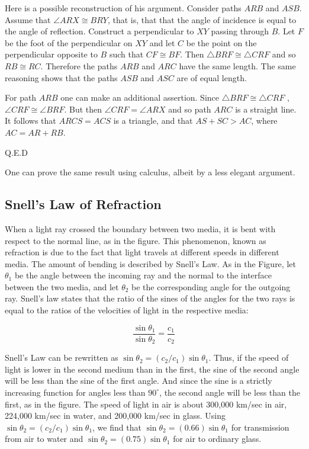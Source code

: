 Here is a possible reconstruction of his argument.  Consider
paths $ARB$ and $ASB$.  Assume that
$\angle ARX \cong BRY$, that is, that that the angle
of incidence is equal to the angle of reflection.  Construct a perpendicular to $XY$ passing through $B$. Let
$F$ be the foot of the perpendicular on $XY$ and let $C$ be the point on the perpendicular opposite to $B$ such that
$CF \cong BF$. Then $\triangle BRF \cong \triangle CRF$ and so $RB \cong RC$.  Therefore the paths $ARB$ and $ARC$ have the same length.  The same reasoning shows that the paths $ASB$  and $ASC$ are of equal length.

For path $ARB$ one can make an additional assertion.
Since $\triangle BRF \cong \triangle CRF$ , $\angle CRF \cong \angle BRF$.
But then $\angle CRF = \angle ARX$ and so path $ARC$ is a
straight line.  It follows that $ARCS = ACS$ is a triangle, and that $AS + SC > AC$, where $AC = AR + RB$.

Q.E.D

One can prove the same result using calculus, albeit by a less elegant argument.


\subsection{Snell's Law of Refraction}

When a light ray crossed the boundary between two media, it is bent with respect to the normal line, as in the figure. This phenomenon, known as refraction is due to the fact that light travels at different speeds in different media.  The amount of bending is described by Snell's Law.  As in the Figure, let $\theta_1$ be the angle between the incoming ray and the normal to the interface between the two media, and let $\theta_2$ be the corresponding angle for the outgoing ray.  Snell's law states that the ratio of the sines of the angles for the two rays is equal to the ratios of the velocities of light in the respective media:


\begin{equation}
\frac{\sin \theta_1}{\sin \theta_2} = \frac{c_1}{c_2}
\end{equation}

 Snell's Law can be rewritten as
$\sin \theta_2 = (c_2/c_1) \sin \theta_1$.  Thus, if the speed of light is lower in the second medium than in the first, the sine of the second angle will be less than the sine of the first angle. And since the sine is a strictly increasing function for angles less than $90^\circ$, the second angle will be less than the first, as in the figure.
 The speed of light in air is about 300,000 km/sec in air, 224,000 km/sec in water, and 200,000 km/sec in glass.  Using
$\sin\theta_2 = (c_2/c_1)\sin\theta_1$, we find that
$\sin\theta_2 =( 0.66)\sin\theta_1$ for transmission
from air to water and $\sin\theta_2 = (0.75)\sin\theta_1$
for air to ordinary glass.


